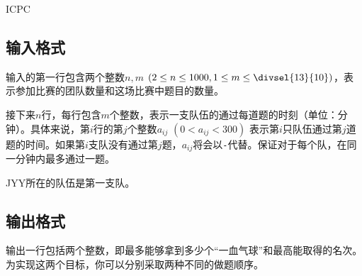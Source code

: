 \begin{Problem}{ICPC}{}
\subsection*{输入格式}

输入的第一行包含两个整数$n, m$ $(2 \leq n \leq 1000, 1 \leq m \leq \divsel{13}{10})$，表示参加比赛的团队数量和这场比赛中题目的数量。

接下来$n$行，每行包含$m$个整数，表示一支队伍的通过每道题的时刻（单位：分钟）。具体来说，第$i$行的第$j$个整数$a_{ij}$ $(0 < a_{ij} < 300)$ 表示第$i$只队伍通过第$j$道题的时间。如果第$i$支队没有通过第$j$题，$a_{ij}$将会以\texttt{-}代替。保证对于每个队，在同一分钟内最多通过一题。

JYY所在的队伍是第一支队。

\subsection*{输出格式}

输出一行包括两个整数，即最多能够拿到多少个“一血气球”和最高能取得的名次。为实现这两个目标，你可以分别采取两种不同的做题顺序。


\end{Problem}


